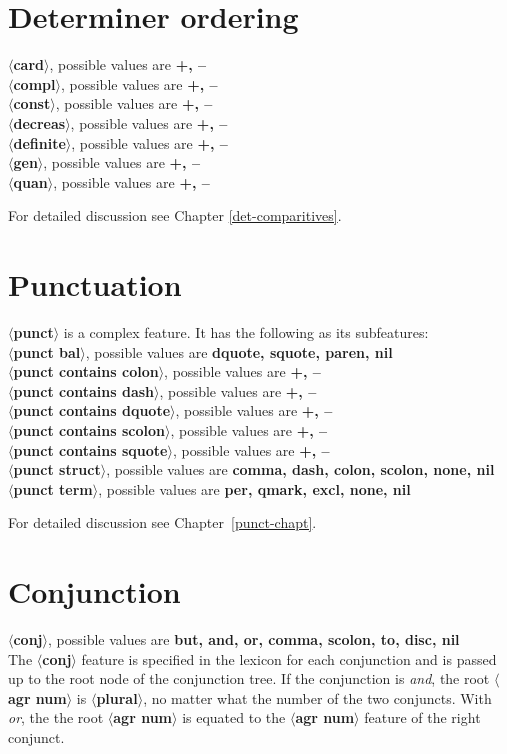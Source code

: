 \section{Determiner ordering}
{\bf $\langle$card$\rangle$}, possible values are {\bf +, --}\\
{\bf $\langle$compl$\rangle$}, possible values are {\bf +, --}\\
{\bf $\langle$const$\rangle$}, possible values are {\bf +, --}\\
{\bf $\langle$decreas$\rangle$}, possible values are {\bf +, --}\\
{\bf $\langle$definite$\rangle$}, possible values are {\bf +, --}\\
{\bf $\langle$gen$\rangle$}, possible values are {\bf +, --}\\
{\bf $\langle$quan$\rangle$}, possible values are {\bf +, --}

For detailed discussion see Chapter \ref{det-comparitives}.

\section{Punctuation}
{\bf $\langle$punct$\rangle$} is a complex feature. It has the following
as its subfeatures:\\
{\bf $\langle$punct bal$\rangle$}, possible values are {\bf dquote,
squote, paren, nil}\\
{\bf $\langle$punct contains colon$\rangle$}, possible values are {\bf +, --}\\
{\bf $\langle$punct contains dash$\rangle$}, possible values are {\bf +, --}\\
{\bf $\langle$punct contains dquote$\rangle$}, possible values are {\bf +, --}\\
{\bf $\langle$punct contains scolon$\rangle$}, possible values are {\bf +, --}\\
{\bf $\langle$punct contains squote$\rangle$}, possible values are {\bf +, --}\\
{\bf $\langle$punct struct$\rangle$}, possible values are {\bf comma,
dash, colon, scolon, none, nil}\\
{\bf $\langle$punct term$\rangle$}, possible values are {\bf per, qmark, excl, 
none, nil}

For detailed discussion see Chapter~\ref{punct-chapt}.


\section{Conjunction}
{\bf $\langle$conj$\rangle$}, possible values are {\bf but, and, or,
comma, scolon, to, disc, nil}\\
The {\bf $\langle$conj$\rangle$} feature is specified in the lexicon
for each conjunction and is passed up to the root node 
of the conjunction tree. If the conjunction is {\em and}, the 
root {\bf $\langle$agr num$\rangle$} is {\bf $\langle$plural$\rangle$}, no
matter what the number of the two conjuncts. With {\em or}, the
the root {\bf $\langle$agr num$\rangle$} is equated to the
{\bf $\langle$agr num$\rangle$} feature of the right conjunct. 


